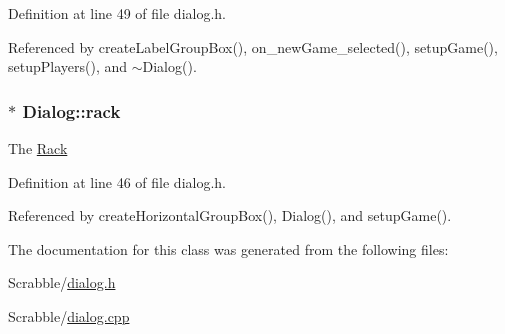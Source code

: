 Definition at line 49 of file dialog.\-h.



Referenced by create\-Label\-Group\-Box(), on\-\_\-new\-Game\-\_\-selected(), setup\-Game(), setup\-Players(), and $\sim$\-Dialog().

\hypertarget{class_dialog_a717eee5215d28c0f10bde1444cb959ed}{
\subsubsection[{rack}]{$\ast$ Dialog\-::rack\hspace{0.3cm}{\ttfamily [private]}}}\label{class_dialog_a717eee5215d28c0f10bde1444cb959ed}
The \hyperlink{class_rack}{Rack} 

Definition at line 46 of file dialog.\-h.



Referenced by create\-Horizontal\-Group\-Box(), Dialog(), and setup\-Game().



The documentation for this class was generated from the following files\-:\begin{DoxyCompactItemize}
\item 
Scrabble/\hyperlink{dialog_8h}{dialog.\-h}\item 
Scrabble/\hyperlink{dialog_8cpp}{dialog.\-cpp}\end{DoxyCompactItemize}
